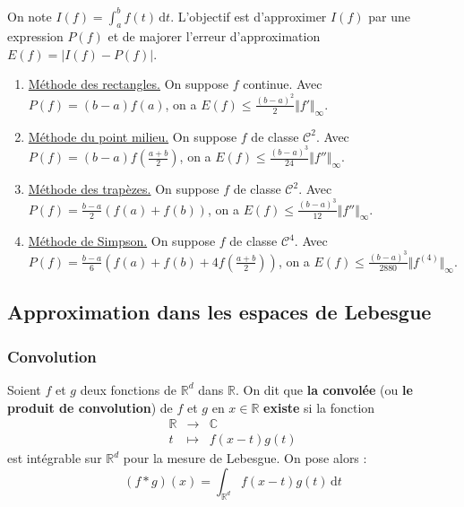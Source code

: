 
  \begin{application}
    On note $I(f) = \int_a^b f(t) \, \mathrm{d}t$. L'objectif est d'approximer $I(f)$ par une expression $P(f)$ et de majorer l'erreur d'approximation $E(f) = \vert I(f) - P(f) \vert$.
    \begin{enumerate}[label=(\roman*)]
      \item \uline{Méthode des rectangles.} On suppose $f$ continue. Avec $P(f) = (b-a)f(a)$, on a $E(f) \leq \frac{(b-a)^2}{2} \Vert f' \Vert_\infty$.
      \item \uline{Méthode du point milieu.} On suppose $f$ de classe $\mathcal{C}^2$. Avec $P(f) = (b-a)f \left( \frac{a+b}{2} \right)$, on a $E(f) \leq \frac{(b-a)^3}{24} \Vert f'' \Vert_\infty$.
      \item \uline{Méthode des trapèzes.} On suppose $f$ de classe $\mathcal{C}^2$. Avec $P(f) = \frac{b-a}{2} (f(a) + f(b))$, on a $E(f) \leq \frac{(b-a)^3}{12} \Vert f'' \Vert_\infty$.
      \item \uline{Méthode de Simpson.} On suppose $f$ de classe $\mathcal{C}^4$. Avec $P(f) = \frac{b-a}{6} \left(f(a) + f(b) + 4f \left( \frac{a+b}{2} \right)\right)$, on a $E(f) \leq \frac{(b-a)^3}{2880} \Vert f^{(4)} \Vert_\infty$.
    \end{enumerate}
  \end{application}

  \subsection{Approximation dans les espaces de Lebesgue}

  \subsubsection{Convolution}


  \begin{definition}
    Soient $f$ et $g$ deux fonctions de $\mathbb{R}^d$ dans $\mathbb{R}$. On dit que \textbf{la convolée} (ou \textbf{le produit de convolution}) de $f$ et $g$ en $x \in \mathbb{R}$ \textbf{existe} si la fonction
    \[
    \begin{array}{ccc}
      \mathbb{R} &\rightarrow& \mathbb{C} \\
      t &\mapsto& f(x-t)g(t)
    \end{array}
    \]
    est intégrable sur $\mathbb{R}^d$ pour la mesure de Lebesgue. On pose alors :
    \[ (f * g)(x) = \int_{\mathbb{R}^d} f(x-t)g(t) \, \mathrm{d}t \]
  \end{definition}

